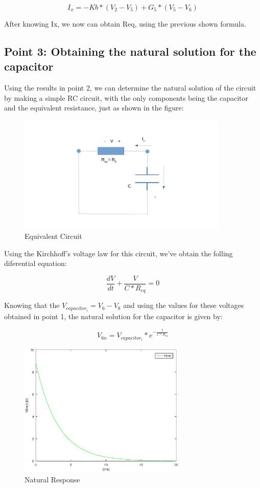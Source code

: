 \setlength{\parskip}{1em}

\begin{equation}
I_x = -Kb*(V_2 - V_5) + G_5*(V_5 - V_6) 
\end{equation}

After knowing Ix, we now can obtain Req, using the previous shown formula.

\subsection{Point 3: Obtaining the natural solution for the capacitor}

Using the results in point 2, we can determine the natural solution of the circuit by making a simple RC circuit, with the only components being the capacitor and the equivalent resistance, just as shown in the figure:

\begin{figure}[H]
\centering
\includegraphics[width = 10cm]{circuit3.pdf}
\caption {Equivalent Circuit}
\end{figure}

Using the Kirchhoff's voltage law for this circuit, we've obtain the folling diferential equation:

\begin{equation}
\frac{dV}{dt} + \frac{V}{C*R_{eq}} = 0
\end{equation}

Knowing that the $V_{capacitor_i} = V_{6} - V_{8}$ and using the values for these voltages obtained in point 1, the natural solution for the capacitor is given by:

\begin{equation}
V_{6n} = V_{capacitor_i} * e^{-\frac{t}{C*R_{eq}}}
\end{equation}

\begin{figure}[H]
\centering
\includegraphics[width = 8cm]{NaturalResponse.eps}
\caption {Natural Response}
\end{figure}



